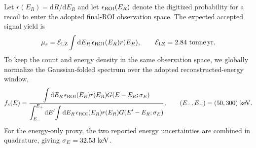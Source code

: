 \documentclass[%
  aps,
  prl,
  reprint,
  superscriptaddress,
  amsmath,
  amssymb,
  longbibliography
]{revtex4-2}
\begin{document}
\clearpage

Let \(r(E_R)=\mathrm{d}R/\mathrm{d}E_R\) and let
\(\epsilon_{\rm ROI}(E_R)\) denote the digitized probability for a recoil to
enter the adopted final-ROI observation space.  The expected accepted signal
yield is
\begin{equation}
 \mu_s={\cal E}_{\rm LZ}\int\mathrm{d}E_R\,
 \epsilon_{\rm ROI}(E_R)r(E_R),
 \qquad {\cal E}_{\rm LZ}=2.84~{\rm tonne\,yr}.
 \label{eq:lz-signal-count-supp}
\end{equation}
To keep the count and energy density in the same observation space, we
{globally normalize the Gaussian-folded spectrum over the adopted
reconstructed-energy window},
\begin{equation}
 f_s(E)=
 \frac{\displaystyle
 \int\mathrm{d}E_R\,\epsilon_{\rm ROI}(E_R)r(E_R)
 G(E-E_R;\sigma_E)}
 {\displaystyle
 \int_{E_-}^{E_+}\mathrm{d}E'\!
 \int\mathrm{d}E_R\,\epsilon_{\rm ROI}(E_R)r(E_R)
 G(E'-E_R;\sigma_E)},
 \qquad (E_-,E_+)=(50,300)~{\rm keV}.
 \label{eq:lz-signal-pdf-supp}
\end{equation}
For the energy-only proxy, the two reported energy uncertainties are combined
in quadrature, giving \(\sigma_E=32.53~{\rm keV}\).
\end{document}
